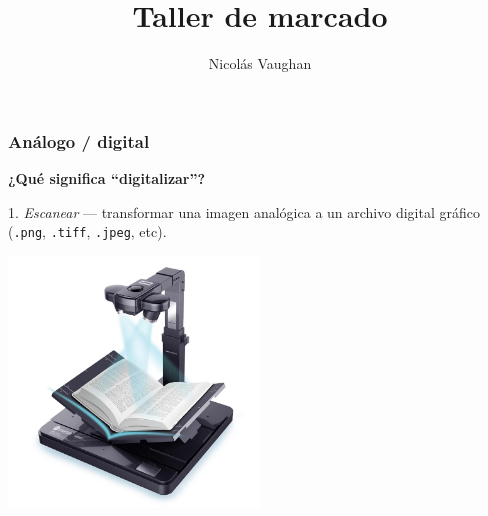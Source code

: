 \documentclass[%
  handout, %
  ]{beamer}
\title{Taller de marcado \TEI}
\subtitle{}
\author{Nicolás Vaughan}
\institute[UA]
{\footnotesize
Universidad de los Andes \\
\medskip
\texttt{n.vaughan@uniandes.edu.co}
}
\date[\tiny\mydate]{\scriptsize\mydate}
\newcommand*{\rojo}[1]{\textcolor[HTML]{8B0000}{#1}}
\newcommand*{\rojoit}[1]{\textit{\textcolor[HTML]{8B0000}{#1}}}
\newcommand{\Azul}{\color{bluenivaca}}
\begin{document}
\begin{frame}
  \titlepage
\end{frame}



\begin{frame}
  \frametitle{Análogo / digital}
  
  {\large\Azul\textbf{¿Qué significa \enquote{digitalizar}?}}

  \bigskip

  \rojo{1.} \rojoit{Escanear} --- transformar una imagen analógica a un archivo digital gráfico (\texttt{.png}, \texttt{.tiff}, \texttt{.jpeg}, etc).

  \begin{center}
    \includegraphics[width=0.5\textwidth]{img/scanning.png}
  \end{center}

\end{frame}
\end{document}
